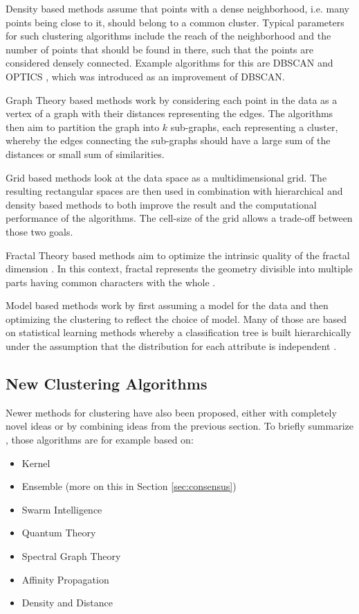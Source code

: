 \documentclass[
	a4paper,
	english,
	twoside,
	openright,               
	11pt                            
	]{report}
\begin{document}
Density based methods assume that points with a dense neighborhood, i.e. many points being close to it, should belong to a common cluster. Typical parameters for such clustering algorithms include the reach of the neighborhood and the number of points that should be found in there, such that the points are considered densely connected. Example algorithms for this are DBSCAN \cite{10.5555/3001460.3001507} and OPTICS \cite{10.1145/304181.304187}, which was introduced as an improvement of DBSCAN.

Graph Theory based methods work by considering each point in the data as a vertex of a graph with their distances representing the edges. The algorithms then aim to partition the graph into $k$ sub-graphs, each representing a cluster, whereby the edges connecting the sub-graphs should have a large sum of the distances or small sum of similarities.

Grid based methods look at the data space as a multidimensional grid. The resulting rectangular spaces are then used in combination with hierarchical and density based methods to both improve the result and the computational performance of the algorithms. The cell-size of the grid allows a trade-off between those two goals.

Fractal Theory based methods aim to optimize the intrinsic quality of the fractal dimension \cite{surveyclustering}. In this context, fractal represents the geometry divisible into multiple parts having common characters with the whole \cite{surveyclustering}.

Model based methods work by first assuming a model for the data and then optimizing the clustering to reflect the choice of model. Many of those are based on statistical learning methods whereby a classification tree is built hierarchically under the assumption that the distribution for each attribute is independent \cite{surveyclustering}.

\subsection{New Clustering Algorithms}

Newer methods for clustering have also been proposed, either with completely novel ideas or by combining ideas from the previous section. To briefly summarize \cite{surveyclustering}, those algorithms are for example based on:

\begin{itemize}
  \item Kernel
  \item Ensemble (more on this in Section \ref{sec:consensus})
  \item Swarm Intelligence
  \item Quantum Theory
  \item Spectral Graph Theory
  \item Affinity Propagation
  \item Density and Distance
\end{itemize}
\end{document}
